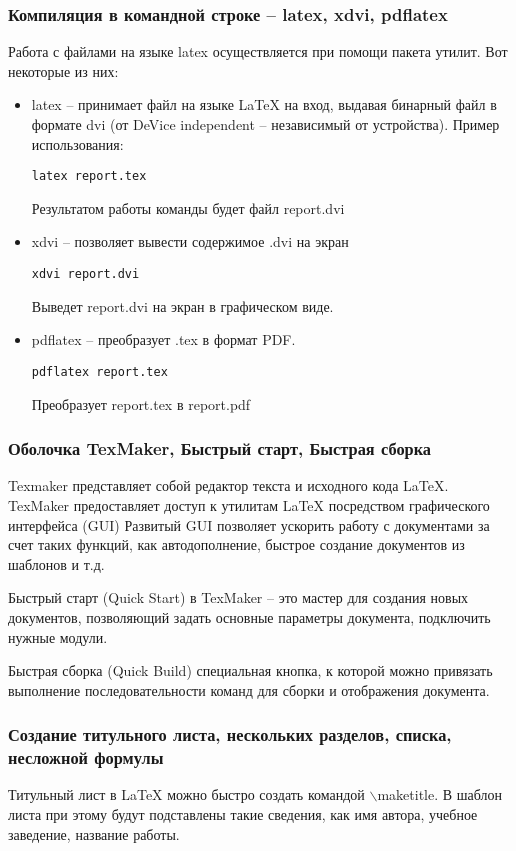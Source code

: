 \documentclass[10pt,a4paper]{article}
\begin{document}
\subsubsection{Компиляция в командной строке – latex, xdvi, pdflatex}
Работа с файлами на языке latex осуществляется при помощи пакета утилит. Вот некоторые из них:
\begin{itemize}
\item latex -- принимает файл на языке \LaTeX{} на вход, выдавая бинарный файл в формате dvi (от DeVice independent -- независимый от устройства). Пример использования:
\begin{Verbatim}[xleftmargin=.5in,fontsize=\small]
latex report.tex
\end{Verbatim}

Результатом работы команды будет файл report.dvi
\item xdvi -- позволяет вывести содержимое .dvi на экран
\begin{Verbatim}[xleftmargin=.5in,fontsize=\small]
xdvi report.dvi
\end{Verbatim}
Выведет report.dvi на экран в графическом виде.
\item pdflatex -- преобразует .tex в формат PDF.
\begin{Verbatim}[xleftmargin=.5in,fontsize=\small]
pdflatex report.tex
\end{Verbatim}
Преобразует report.tex в report.pdf
\end{itemize}
\subsubsection{Оболочка TexMaker, Быстрый старт, Быстрая сборка}
Texmaker представляет собой редактор текста и исходного кода LaTeX. TexMaker предоставляет доступ к утилитам LaTeX посредством графического интерфейса (GUI) Развитый GUI позволяет ускорить работу с документами за счет таких функций, как автодополнение, быстрое создание документов из шаблонов и т.д.

Быстрый старт (Quick Start) в TexMaker -- это мастер для создания новых документов, позволяющий задать основные параметры документа, подключить нужные модули.

Быстрая сборка (Quick Build) специальная кнопка, к которой можно привязать выполнение последовательности команд для сборки и отображения документа. 
\subsubsection{Создание титульного листа, нескольких разделов, списка, несложной формулы}
Титульный лист в LaTeX можно быстро создать командой $\backslash$maketitle. В шаблон листа при этому будут подставлены такие сведения, как имя автора, учебное заведение, название работы.
 
\end{document}
